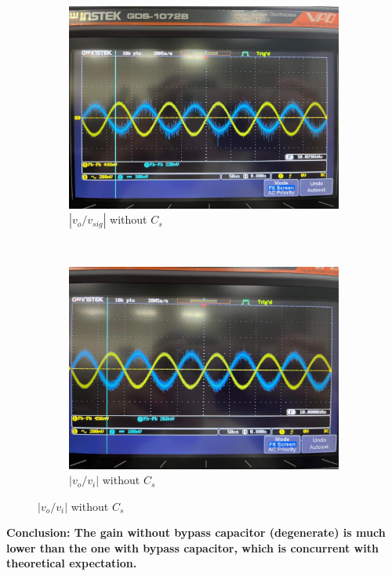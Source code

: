 \documentclass{article}
\begin{document}
\begin{CJK*}{UTF8}{bkai}
\begin{figure}[h]
\begin{center}
        \begin{subfigure}[b]{0.35\textwidth}
            \includegraphics[width=\textwidth]{vsig_wcs.jpg}
            \caption{$\left\lvert v_o/v_{sig} \right\rvert$ without $C_s$}
        \end{subfigure}
        ~
        \begin{subfigure}[b]{0.35\textwidth}
            \includegraphics[width=\textwidth]{vi_wcs.jpg}
            \caption{$\left\lvert v_o/v_{i} \right\rvert$ without $C_s$}
        \end{subfigure}
    \end{center}
\end{figure}
\textbf{Conclusion: The gain without bypass capacitor (degenerate) is much lower than the one with bypass capacitor, which is concurrent with theoretical expectation.}

\end{CJK*}
\end{document}

